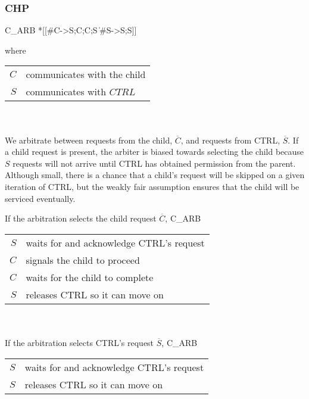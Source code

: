 \documentclass[aer.tex]{subfiles}
\begin{document}
\subsubsection*{CHP}

\begin{csp}
C_ARB\equiv
  *[[#C->S;C;C;S
    \|#S->S;S]]
\end{csp}

\noindent where 

\begin{tabular}[]{rl}
  $C$ & communicates with the child \\ 
  $S$ & communicates with $CTRL$ \\
\end{tabular} \\ \\

We arbitrate between requests from the child, $\overline{C}$, and 
requests from CTRL, $\overline{S}$. If a child request is present, the arbiter is biased towards selecting the child because $S$ requests will not arrive until CTRL has obtained permission from the parent. Although small, there is a chance that a child's request will be skipped on a given iteration of CTRL, but the weakly fair assumption ensures that the child will be serviced eventually.

\noindent If the arbitration selects the child request $\overline{C}$, C\_ARB

\begin{tabular}[]{rl}
  $S$ & waits for and acknowledge CTRL's request \\
  $C$ & signals the child to proceed \\
  $C$ & waits for the child to complete \\
  $S$ & releases CTRL so it can move on \\
\end{tabular} \\ \\

\noindent If the arbitration selects CTRL's request $\overline{S}$, C\_ARB

\begin{tabular}[]{rl}
  $S$ & waits for and acknowledge CTRL's request \\
  $S$ & releases CTRL so it can move on \\
\end{tabular} \\ \\
\end{document}
